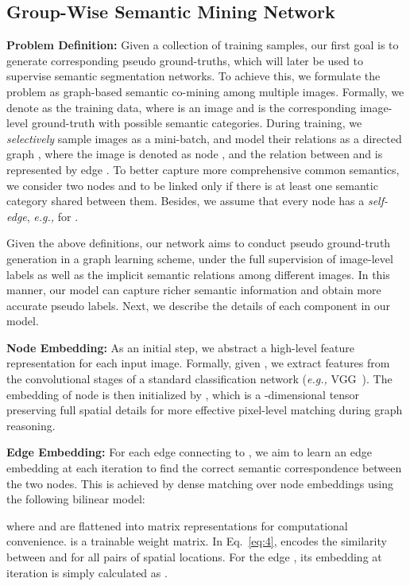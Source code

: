 \documentclass[letterpaper]{article} \usepackage{aaai21}  \usepackage{times}  \usepackage{helvet} \usepackage{courier}  \usepackage[hyphens]{url}  \usepackage{graphicx} \urlstyle{rm} \def\UrlFont{\rm}  \usepackage{graphicx}  \usepackage{natbib}  \usepackage{caption} \frenchspacing  \setlength{\pdfpagewidth}{8.5in}  \setlength{\pdfpageheight}{11in}
\newcommand{\eg}[1]{\textit{e.g.,}}
\begin{document}
\subsection{Group-Wise Semantic Mining Network}

\noindent\textbf{Problem Definition:} 
Given a collection of training samples, our first goal is to generate corresponding pseudo ground-truths, which will later be used to supervise semantic segmentation networks. To achieve this, we formulate the problem as graph-based semantic co-mining among multiple images. Formally, we denote  as the training data, where  is an image and  is the corresponding image-level ground-truth with  possible semantic categories. During training, we \textit{selectively} sample  images  as a mini-batch, and model their relations as a directed graph , where the image  is denoted as node , and the relation between  and  is represented by edge . To better capture more comprehensive common semantics, we consider two nodes  and  to be linked only if there is at least one semantic category shared between them. Besides, we assume that every node has a \textit{self-edge}, \eg,  for .

Given the above definitions, our network aims to conduct pseudo ground-truth generation in a graph learning scheme, under the full supervision of image-level labels as well as the implicit semantic relations among different images. In this manner, our model can capture richer semantic information and obtain more accurate pseudo labels. Next, we describe the details of each component in our model.

\noindent\textbf{Node Embedding:}
As an initial step, we abstract a high-level feature representation for each input image. Formally, given , we extract features  from the convolutional stages of a standard classification network (\eg, VGG\!~\cite{simonyan2014very}). The embedding of node  is then initialized by , which is a -dimensional tensor preserving full spatial details for more effective pixel-level matching during graph reasoning. 

\noindent\textbf{Edge Embedding:} For each edge  connecting  to , we aim to learn an edge embedding  at each iteration  to find the correct semantic correspondence between the two nodes. This is achieved by dense matching over node embeddings using the following bilinear model:

where  and  are flattened into matrix representations for computational convenience.  is a trainable weight matrix. In Eq.~\eqref{eq:4},  encodes the similarity between  and  for all pairs of spatial locations.
For the edge , its embedding at iteration  is simply calculated as .
\end{document}
